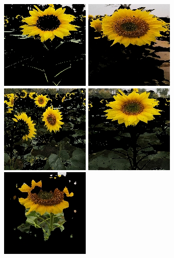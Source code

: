 \documentclass[supercite]{HustGraduPaper}
\begin{document}
\begin{sloppypar}
\begin{figure}[H]
\begin{minipage}[t]{0.24\textwidth}
     \includegraphics[scale=0.55]{seg31.jpg}
     \end{minipage}
     \begin{minipage}[t]{0.24\textwidth}
      \centering
      \includegraphics[scale=0.55]{seg12.jpg}
    
      \includegraphics[scale=0.55]{seg22.jpg}
     
      \includegraphics[scale=0.55]{seg32.jpg}
      \end{minipage}
      \begin{minipage}[t]{0.24\textwidth}
        \centering
        \includegraphics[scale=0.55]{seg13.jpg}
    

\end{minipage}
\end{figure}
\end{sloppypar}
\end{document}
